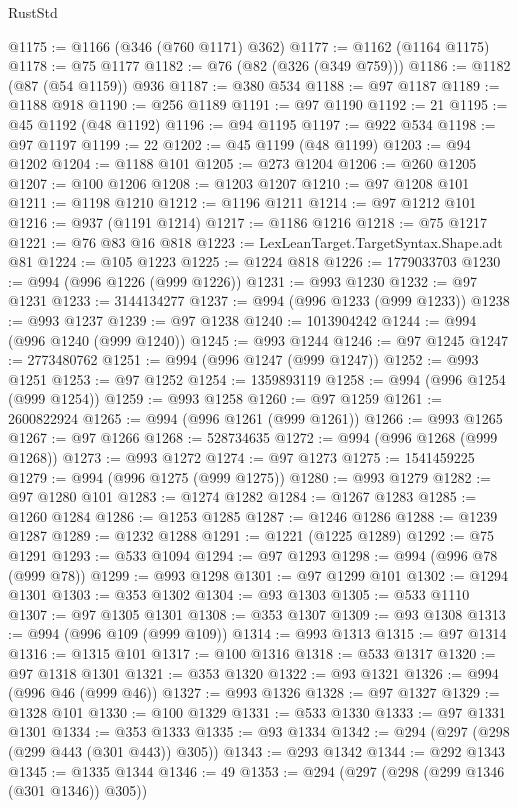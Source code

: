 \begin{lexlean}{RustStd}
\begin{coremodule}
@1175 := @1166 (@346 (@760 @1171) @362)
@1177 := @1162 (@1164 @1175)
@1178 := @75 @1177
@1182 := @76 (@82 (@326 (@349 @759)))
@1186 := @1182 (@87 (@54 @1159)) @936
@1187 := @380 @534
@1188 := @97 @1187
@1189 := @1188 @918
@1190 := @256 @1189
@1191 := @97 @1190
@1192 := 21
@1195 := @45 @1192 (@48 @1192)
@1196 := @94 @1195
@1197 := @922 @534
@1198 := @97 @1197
@1199 := 22
@1202 := @45 @1199 (@48 @1199)
@1203 := @94 @1202
@1204 := @1188 @101
@1205 := @273 @1204
@1206 := @260 @1205
@1207 := @100 @1206
@1208 := @1203 @1207
@1210 := @97 @1208 @101
@1211 := @1198 @1210
@1212 := @1196 @1211
@1214 := @97 @1212 @101
@1216 := @937 (@1191 @1214)
@1217 := @1186 @1216
@1218 := @75 @1217
@1221 := @76 @83 @16 @818
@1223 := LexLeanTarget.TargetSyntax.Shape.adt @81
@1224 := @105 @1223
@1225 := @1224 @818
@1226 := 1779033703
@1230 := @994 (@996 @1226 (@999 @1226))
@1231 := @993 @1230
@1232 := @97 @1231
@1233 := 3144134277
@1237 := @994 (@996 @1233 (@999 @1233))
@1238 := @993 @1237
@1239 := @97 @1238
@1240 := 1013904242
@1244 := @994 (@996 @1240 (@999 @1240))
@1245 := @993 @1244
@1246 := @97 @1245
@1247 := 2773480762
@1251 := @994 (@996 @1247 (@999 @1247))
@1252 := @993 @1251
@1253 := @97 @1252
@1254 := 1359893119
@1258 := @994 (@996 @1254 (@999 @1254))
@1259 := @993 @1258
@1260 := @97 @1259
@1261 := 2600822924
@1265 := @994 (@996 @1261 (@999 @1261))
@1266 := @993 @1265
@1267 := @97 @1266
@1268 := 528734635
@1272 := @994 (@996 @1268 (@999 @1268))
@1273 := @993 @1272
@1274 := @97 @1273
@1275 := 1541459225
@1279 := @994 (@996 @1275 (@999 @1275))
@1280 := @993 @1279
@1282 := @97 @1280 @101
@1283 := @1274 @1282
@1284 := @1267 @1283
@1285 := @1260 @1284
@1286 := @1253 @1285
@1287 := @1246 @1286
@1288 := @1239 @1287
@1289 := @1232 @1288
@1291 := @1221 (@1225 @1289)
@1292 := @75 @1291
@1293 := @533 @1094
@1294 := @97 @1293
@1298 := @994 (@996 @78 (@999 @78))
@1299 := @993 @1298
@1301 := @97 @1299 @101
@1302 := @1294 @1301
@1303 := @353 @1302
@1304 := @93 @1303
@1305 := @533 @1110
@1307 := @97 @1305 @1301
@1308 := @353 @1307
@1309 := @93 @1308
@1313 := @994 (@996 @109 (@999 @109))
@1314 := @993 @1313
@1315 := @97 @1314
@1316 := @1315 @101
@1317 := @100 @1316
@1318 := @533 @1317
@1320 := @97 @1318 @1301
@1321 := @353 @1320
@1322 := @93 @1321
@1326 := @994 (@996 @46 (@999 @46))
@1327 := @993 @1326
@1328 := @97 @1327
@1329 := @1328 @101
@1330 := @100 @1329
@1331 := @533 @1330
@1333 := @97 @1331 @1301
@1334 := @353 @1333
@1335 := @93 @1334
@1342 := @294 (@297 (@298 (@299 @443 (@301 @443)) @305))
@1343 := @293 @1342
@1344 := @292 @1343
@1345 := @1335 @1344
@1346 := 49
@1353 := @294 (@297 (@298 (@299 @1346 (@301 @1346)) @305))

\end{coremodule}
\end{lexlean}

